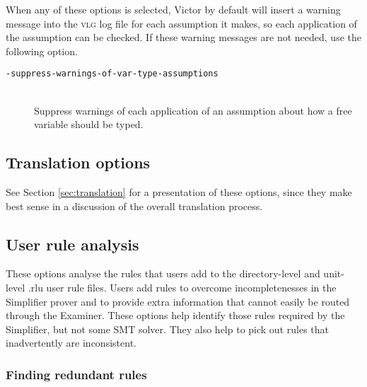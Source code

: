 \documentclass[12pt,fleqn]{article}
\newcommand{\logfile}{\textsc{vlg}}
\newcommand{\optionb}[1]{\item[\texttt{-{#1}}]\ \\}
\begin{document}
When any of these options is selected, Victor by default will insert a
warning message into the \logfile{} log file for each assumption it
makes, so each application of the assumption can be checked.  If these
warning messages are not needed, use the following option.
\begin{description}
  \optionb{suppress-warnings-of-var-type-assumptions} Suppress
  warnings of each application of an assumption about how a free
  variable should be typed.
\end{description}

\subsection{Translation options}

See Section \ref{sec:translation} for a presentation of these options,
since they make best sense in a discussion of the overall translation
process.

\subsection{User rule analysis}
\label{sec:user-rule-analysis}

These options analyse the rules that users add to the directory-level
and unit-level .rlu user rule files.  Users add rules to overcome
incompletenesses in the Simplifier prover and to provide extra
information that cannot easily be routed through the Examiner.  These
options help identify those rules required by the Simplifier, but not
some SMT solver.  They also help to pick out rules that inadvertently
are inconsistent.


\subsubsection{Finding redundant rules}
\end{document}
